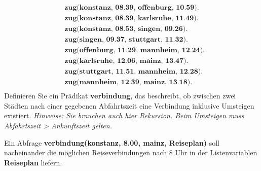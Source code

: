 \begin{align*}
  &\textbf{zug(konstanz, 08.39, offenburg, 10.59).}   \\
  &\textbf{zug(konstanz, 08.39, karlsruhe, 11.49).}   \\
  &\textbf{zug(konstanz, 08.53, singen, 09.26).}      \\
  &\textbf{zug(singen, 09.37, stuttgart, 11.32).}     \\
  &\textbf{zug(offenburg, 11.29, mannheim, 12.24).}   \\
  &\textbf{zug(karlsruhe, 12.06, mainz, 13.47).}      \\
  &\textbf{zug(stuttgart, 11.51, mannheim, 12.28).}   \\
  &\textbf{zug(mannheim, 12.39, mainz, 13.18).}       \\
\end{align*}
\newline
Definieren Sie ein Prädikat \textbf{verbindung}, das beschreibt, ob zwischen zwei Städten nach einer gegebenen Abfahrtszeit eine Verbindung inklusive Umsteigen existiert.
\textit{Hinweise: Sie brauchen auch hier Rekursion. Beim Umsteigen muss Abfahrtszeit > Ankunftszeit gelten.}

Ein Abfrage \textbf{verbindung(konstanz, 8.00, mainz, Reiseplan)} soll nacheinander die möglichen Reiseverbindungen nach 8 Uhr in der Listenvariablen \textbf{Reiseplan} liefern.
\newline

